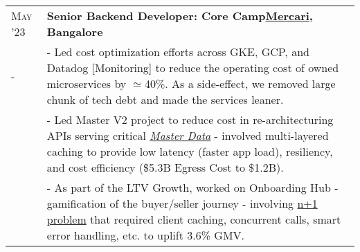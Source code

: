 \documentclass[a4paper,10pt]{extarticle} %
\begin{document}
\begin{tabularx}{\linewidth}{ l | X }


  \textsc{May '23} & \textbf{Senior Backend Developer: Core Camp}\hfill\textbf{\href{https://about.in.mercari.com/}{Mercari}, Bangalore}                                                                                                                                                                                                                          \\
  \textsc{-}       & {- Led cost optimization efforts across GKE, GCP, and Datadog [Monitoring] to reduce the operating cost of owned microservices by $\simeq$40\%. As a side-effect, we removed large chunk of tech debt and made the services leaner.}                                                                                                         \\
                   & {- Led Master V2 project to reduce cost in re-architecturing APIs serving critical \emph{\href{https://en.wikipedia.org/wiki/Master_data}{Master Data}} - involved multi-layered caching to provide low latency (faster app load), resiliency, and cost efficiency (\$5.3B Egress Cost to \$1.2B).}                                          \\
                   & {- As part of the LTV Growth, worked on Onboarding Hub - gamification of the buyer/seller journey - involving \href{https://stackoverflow.com/questions/97197/what-is-the-n1-selects-problem-in-orm-object-relational-mapping}{n+1 problem} that required client caching, concurrent calls, smart error handling, etc. to uplift 3.6\% GMV.} \\[2mm]


\end{tabularx}
\end{document}
